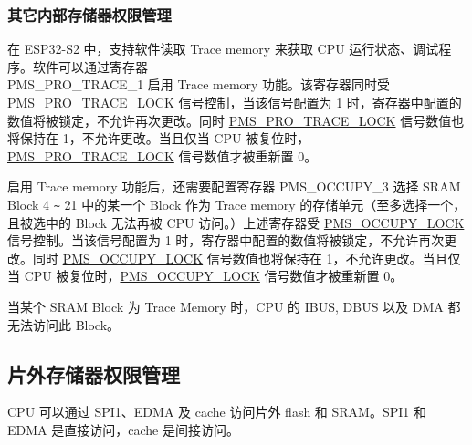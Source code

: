 \documentclass[main\_\_CN.tex]{subfiles}
\begin{document}
\subsubsection{其它内部存储器权限管理}
在 ESP32-S2 中，支持软件读取 Trace memory 来获取 CPU 运行状态、调试程序。软件可以通过寄存器\\ PMS\_PRO\_TRACE\_1 启用 Trace memory 功能。该寄存器同时受 \hyperref[fielddesc:PMSPROTRACELOCK]{PMS\_PRO\_TRACE\_LOCK} 信号控制，当该信号配置为 1 时，寄存器中配置的数值将被锁定，不允许再次更改。同时 \hyperref[fielddesc:PMSPROTRACELOCK]{PMS\_PRO\_TRACE\_LOCK} 信号数值也将保持在 1，不允许更改。当且仅当 CPU 被复位时，\hyperref[fielddesc:PMSPROTRACELOCK]{PMS\_PRO\_TRACE\_LOCK} 信号数值才被重新置 0。

启用 Trace memory 功能后，还需要配置寄存器 PMS\_OCCUPY\_3 选择 SRAM Block 4 \verb+~+ 21 中的某一个 Block 作为 Trace memory 的存储单元（至多选择一个，且被选中的 Block 无法再被 CPU 访问。）上述寄存器受 \hyperref[fielddesc:PMSOCCUPYLOCK]{PMS\_OCCUPY\_LOCK} 信号控制。当该信号配置为 1 时，寄存器中配置的数值将被锁定，不允许再次更改。同时 \hyperref[fielddesc:PMSOCCUPYLOCK]{PMS\_OCCUPY\_LOCK} 信号数值也将保持在 1，不允许更改。当且仅当 CPU 被复位时，\hyperref[fielddesc:PMSOCCUPYLOCK]{PMS\_OCCUPY\_LOCK} 信号数值才被重新置 0。

当某个 SRAM Block 为 Trace Memory 时，CPU 的 IBUS, DBUS 以及 DMA 都无法访问此 Block。

\subsection{片外存储器权限管理}
CPU 可以通过 SPI1、EDMA 及 cache 访问片外 flash 和 SRAM。SPI1 和 EDMA 是直接访问，cache 是间接访问。
\end{document}
